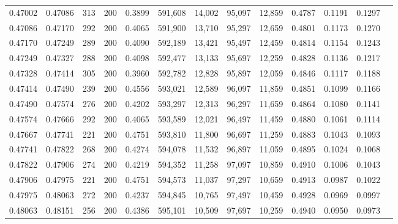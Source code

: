 \begin{tabular}{rrrrrrrrrrrrr}
0.47002 & 0.47086 &   313 & 200 &                                     0.3899 & 591,608 &  14,002 &  95,097 &  12,859 & 0.4787 & 0.1191 & 0.1297 \\
0.47086 & 0.47170 &   292 & 200 &                                     0.4065 & 591,900 &  13,710 &  95,297 &  12,659 & 0.4801 & 0.1173 & 0.1270 \\
0.47170 & 0.47249 &   289 & 200 &                                     0.4090 & 592,189 &  13,421 &  95,497 &  12,459 & 0.4814 & 0.1154 & 0.1243 \\
0.47249 & 0.47327 &   288 & 200 &                                     0.4098 & 592,477 &  13,133 &  95,697 &  12,259 & 0.4828 & 0.1136 & 0.1217 \\
0.47328 & 0.47414 &   305 & 200 &                                     0.3960 & 592,782 &  12,828 &  95,897 &  12,059 & 0.4846 & 0.1117 & 0.1188 \\
0.47414 & 0.47490 &   239 & 200 &                                     0.4556 & 593,021 &  12,589 &  96,097 &  11,859 & 0.4851 & 0.1099 & 0.1166 \\
0.47490 & 0.47574 &   276 & 200 &                                     0.4202 & 593,297 &  12,313 &  96,297 &  11,659 & 0.4864 & 0.1080 & 0.1141 \\
0.47574 & 0.47666 &   292 & 200 &                                     0.4065 & 593,589 &  12,021 &  96,497 &  11,459 & 0.4880 & 0.1061 & 0.1114 \\
0.47667 & 0.47741 &   221 & 200 &                                     0.4751 & 593,810 &  11,800 &  96,697 &  11,259 & 0.4883 & 0.1043 & 0.1093 \\
0.47741 & 0.47822 &   268 & 200 &                                     0.4274 & 594,078 &  11,532 &  96,897 &  11,059 & 0.4895 & 0.1024 & 0.1068 \\
0.47822 & 0.47906 &   274 & 200 &                                     0.4219 & 594,352 &  11,258 &  97,097 &  10,859 & 0.4910 & 0.1006 & 0.1043 \\
0.47906 & 0.47975 &   221 & 200 &                                     0.4751 & 594,573 &  11,037 &  97,297 &  10,659 & 0.4913 & 0.0987 & 0.1022 \\
0.47975 & 0.48063 &   272 & 200 &                                     0.4237 & 594,845 &  10,765 &  97,497 &  10,459 & 0.4928 & 0.0969 & 0.0997 \\
0.48063 & 0.48151 &   256 & 200 &                                     0.4386 & 595,101 &  10,509 &  97,697 &  10,259 & 0.4940 & 0.0950 & 0.0973 \\

\end{tabular}

